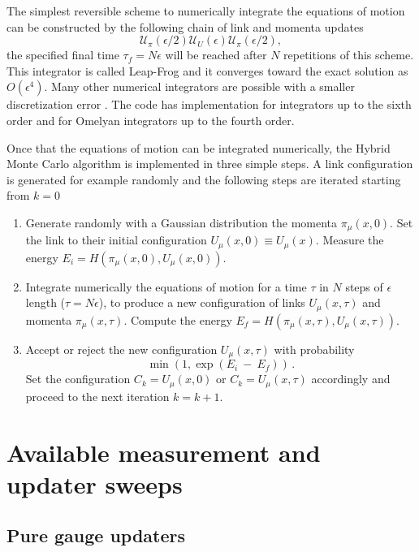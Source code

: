 \documentclass[11pt,a4paper]{article}
\begin{document}
The simplest reversible scheme to numerically integrate the equations of motion can be constructed by the following chain of link and momenta updates
\begin{equation*}
\mathcal{U}_\pi(\epsilon/2) \mathcal{U}_U(\epsilon) \mathcal{U}_\pi(\epsilon/2),
\end{equation*}
the specified final time $\tau_f = N \epsilon$ will be reached after $N$ repetitions of this scheme. This integrator is called Leap-Frog and it converges toward the exact solution as $O(\epsilon^4)$. Many other numerical integrators are possible with a smaller discretization error \cite{OME02,TAK06}. The code has implementation for integrators up to the sixth order and for Omelyan integrators up to the fourth order. 

Once that the equations of motion can be integrated numerically, the Hybrid Monte Carlo algorithm is implemented in three simple steps. A link configuration is generated for example randomly and the following steps are iterated starting from $k = 0$
\begin{enumerate}
\item Generate randomly with a Gaussian distribution the momenta $\pi_\mu(x,0)$. Set the link to their initial configuration $U_\mu(x,0) \equiv U_\mu(x)$. Measure the energy $E_i = H(\pi_\mu(x,0), U_\mu(x,0))$.
\item Integrate numerically the equations of motion for a time $\tau$ in $N$ steps of $\epsilon$ length ($\tau = N \epsilon$), to produce a new configuration of links $U_\mu(x,\tau)$ and momenta $\pi_\mu(x,\tau)$. Compute the energy $E_f = H(\pi_\mu(x,\tau), U_\mu(x,\tau))$.
\item Accept or reject the new configuration $U_\mu(x,\tau)$ with probability 
\begin{equation*}
\min(1,\exp(E_i~-~E_f))\,.
\end{equation*}
Set the configuration $C_k = U_\mu(x,0)$ or $C_k = U_\mu(x,\tau)$ accordingly and proceed to the next iteration $k = k + 1$.
\end{enumerate}

\section{Available measurement and updater sweeps}

\subsection{Pure gauge updaters}
\end{document}
